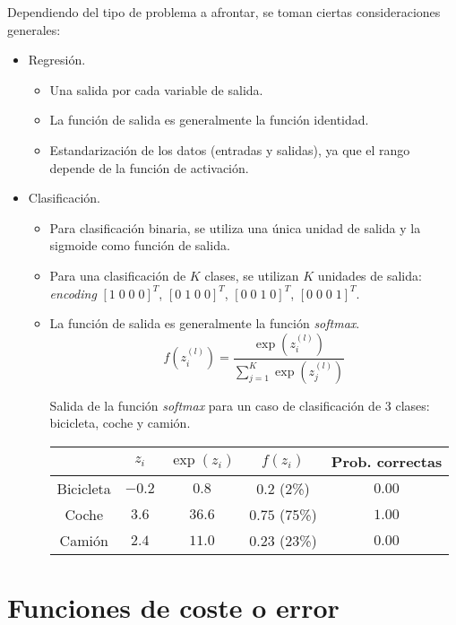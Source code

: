 Dependiendo del tipo de problema a afrontar, se toman ciertas consideraciones generales: 
\begin{itemize}
\item Regresión.
\begin{itemize}
\item Una salida por cada variable de salida.
\item La función de salida es generalmente la función identidad.
\item Estandarización de los datos (entradas y salidas), ya que el rango depende de la función de activación.
\end{itemize}
\item Clasificación. 
\begin{itemize}
\item Para clasificación binaria, se utiliza una única unidad de salida y la sigmoide como función de salida.
\item Para una clasificación de $K$ clases, se utilizan $K$ unidades de salida: \textit{encoding} $[1 \; 0 \; 0 \; 0]^T$, $[0 \; 1 \; 0 \; 0]^T$, $[0 \; 0 \; 1 \; 0]^T$, $[0 \; 0 \; 0 \; 1]^T$.
\item La función de salida es generalmente la función \textit{softmax}.
\begin{equation}
f(z_i^{(l)}) = \frac{\exp(z_i^{(l)})}{\sum_{j = 1}^K \exp(z_j^{(l)})}
\end{equation}
\begin{example}
Salida de la función \textit{softmax} para un caso de clasificación de 3 clases: bicicleta, coche y camión.
\begin{table}[H]
\centering
\begin{tabular}{ccccc}
\hline \hline
 & $z_i$ & $\exp(z_i)$ & $f(z_i)$ & Prob. correctas \\ \hline \hline
Bicicleta & $-0.2$ & $0.8$ & $0.2$ (2\%) & $0.00$ \\
Coche & $3.6$ & $36.6$ & $0.75$ (75\%) & $1.00$ \\
Camión & $2.4$ & $11.0$ & $0.23$ (23\%) & $0.00$ \\ \hline 
\end{tabular}
\end{table}
\end{example}
\end{itemize}
\end{itemize}

\section{Funciones de coste o error}

